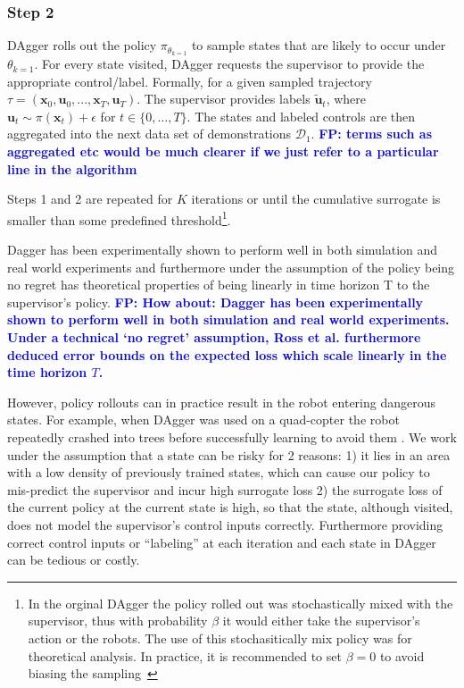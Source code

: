 \documentclass[10pt, conference]{ieeeconf}      %
\newcommand{\bu}{\mathbf{u}}
\newcommand{\bx}{\mathbf{x}}
\newcommand{\fpnote}[1]{\ifthenelse{\boolean{include-notes}}%
 {\textcolor{blue}{\textbf{FP: #1}}}{}}
\begin{document}
 \subsubsection{Step 2}
DAgger rolls out the policy $\pi_{\theta_{k=1}}$ to sample states that are likely to occur under $\theta_{k=1}$. For every state visited, DAgger requests the supervisor to provide the appropriate control/label. Formally, for a given sampled trajectory  $\tau = (\bx_0,\bu_0,...,\bx_T,\bu_T )$. The supervisor provides labels $\tilde{\bu}_t$, where $\bu_t \sim \pi(\bx_t) + \epsilon$ for $t\in \{0, \ldots, T\}$.
The states and labeled controls are then aggregated into the next data set of demonstrations $\mathcal{D}_1$. 
\fpnote{terms such as aggregated etc would be much clearer if we just refer to a particular line in the algorithm}

Steps 1 and 2 are repeated for $K$ iterations or until 
the cumulative surrogate is smaller than some predefined threshold\footnote{In the orginal DAgger the policy rolled out
was stochastically mixed with the supervisor, thus with probability $\beta$ it would either take the supervisor's action
or the robots. The use of this stochasitically mix policy was for theoretical analysis. In practice, it is recommended
to set $\beta = 0$ to avoid biasing the sampling~\cite{NIPS2014_5421,ross2010reduction}}.

Dagger has been experimentally shown to perform  well in both simulation and real world experiments and furthermore under the assumption of the policy being no regret has theoretical properties of being linearly in time horizon T to the supervisor's policy. 
\fpnote{How about: Dagger has been experimentally shown to perform well in both simulation and real world
    experiments. Under a technical `no regret' assumption, Ross et al.\cite{ross2013learning} furthermore
deduced error bounds on the expected loss which scale linearly in the time horizon $T$.}

However, policy rollouts can in practice result in the robot entering dangerous states. For example, when DAgger was used on a
quad-copter the robot repeatedly crashed into trees before successfully learning to avoid them \cite{ross2013learning}.
We work under the assumption that a state can be risky for 2 reasons: 1) it lies in an area with a low density of
previously trained states, which can cause our policy to mis-predict the supervisor and incur high surrogate
loss \cite{tokdar2010importance} 2) the surrogate loss of the current policy at the current state is high, so that the state, although visited, does
not model the supervisor's control inputs correctly. Furthermore providing correct control inputs or ``labeling'' at each
iteration and each state in DAgger can be tedious or costly.
\end{document}
